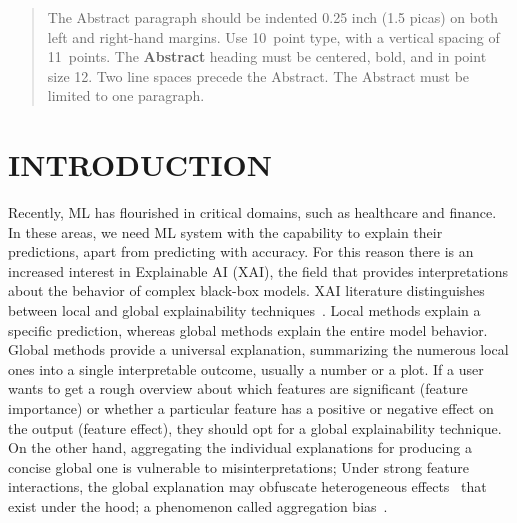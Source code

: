 \documentclass[twoside]{article}
\begin{document}
%

%


\begin{abstract}
  The Abstract paragraph should be indented 0.25 inch (1.5 picas) on
  both left and right-hand margins. Use 10~point type, with a vertical
  spacing of 11~points. The \textbf{Abstract} heading must be centered,
  bold, and in point size 12. Two line spaces precede the
  Abstract. The Abstract must be limited to one paragraph.
\end{abstract}


\section{INTRODUCTION}

Recently, ML has flourished in critical domains, such as healthcare
and finance. In these areas, we need ML system with the capability to
explain their predictions, apart from predicting with accuracy. For
this reason there is an increased interest in Explainable AI (XAI),
the field that provides interpretations about the behavior of complex
black-box models. XAI literature distinguishes between local and
global explainability
techniques~\citep{Molnar2020interpretable}. Local methods explain a
specific prediction, whereas global methods explain the entire model
behavior. Global methods provide a universal explanation, summarizing
the numerous local ones into a single interpretable outcome, usually a
number or a plot. If a user wants to get a rough overview about which
features are significant (feature importance) or whether a particular
feature has a positive or negative effect on the output (feature
effect), they should opt for a global explainability technique. On
the other hand, aggregating the individual explanations for producing
a concise global one is vulnerable to misinterpretations; Under strong
feature interactions, the global explanation may obfuscate
heterogeneous effects~\citep{herbinger2022repid} that exist under the
hood; a phenomenon called aggregation bias~\citep{mehrabi2021survey}.
\end{document}
